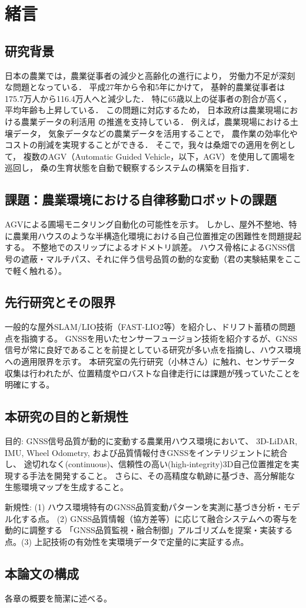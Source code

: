 \documentclass[main]{subfiles}
\begin{document}
\chapter{緒言}

\section{研究背景}
日本の農業では，農業従事者の減少と高齢化の進行により，
労働力不足が深刻な問題となっている\cite{ref:nourin}．
平成27年から令和5年にかけて，
基幹的農業従事者は175.7万人から116.4万人へと減少した．
特に65歳以上の従事者の割合が高く，
平均年齢も上昇している\cite{ref:roudou}．
この問題に対応するため，
日本政府は農業現場における農業データの利活用
の推進を支持している\cite{ref:nou_data}．
例えば，農業現場における土壌データ，
気象データなどの農業データを活用することで，
農作業の効率化やコストの削減を実現することができる．
そこで，我々は桑畑での適用を例として，
複数のAGV（Automatic Guided Vehicle，以下，AGV）を使用して圃場を巡回し，
桑の生育状態を自動で観察するシステムの構築を目指す．

\section{課題：農業環境における自律移動ロボットの課題}
AGVによる圃場モニタリング自動化の可能性を示す。
しかし、屋外不整地、特に農業用ハウスのような半構造化環境における自己位置推定の困難性を問題提起する。
不整地でのスリップによるオドメトリ誤差。
ハウス骨格によるGNSS信号の遮蔽・マルチパス、それに伴う信号品質の動的な変動（君の実験結果をここで軽く触れる）。

\section{先行研究とその限界}
一般的な屋外SLAM/LIO技術（FAST-LIO2等）を紹介し、ドリフト蓄積の問題点を指摘する。
GNSSを用いたセンサーフュージョン技術を紹介するが、GNSS信号が常に良好であることを前提としている研究が多い点を指摘し、ハウス環境への適用限界を示す。
本研究室の先行研究（小林さん）に触れ、センサデータ収集は行われたが、位置精度やロバストな自律走行には課題が残っていたことを明確にする。

\section{本研究の目的と新規性}
目的: GNSS信号品質が動的に変動する農業用ハウス環境において、
3D-LiDAR, IMU, Wheel Odometry, および品質情報付きGNSSをインテリジェントに統合し、
途切れなく(continuous)、信頼性の高い(high-integrity)3D自己位置推定を実現する手法を開発すること。
さらに、その高精度な軌跡に基づき、高分解能な生態環境マップを生成すること。

新規性: 
(1) ハウス環境特有のGNSS品質変動パターンを実測に基づき分析・モデル化する点。
(2) GNSS品質情報（協方差等）に応じて融合システムへの寄与を動的に調整する
「GNSS品質監視・融合制御」アルゴリズムを提案・実装する点。(3) 上記技術の有効性を実環境データで定量的に実証する点。

\section{本論文の構成}
各章の概要を簡潔に述べる。 
\end{document}
